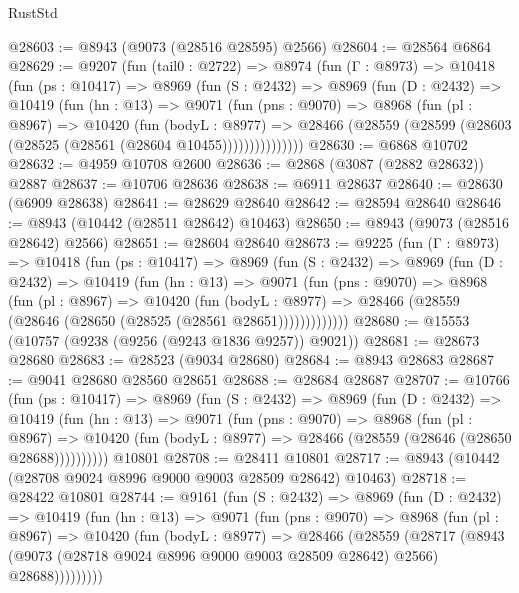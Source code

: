 \begin{lexlean}{RustStd}
\begin{coremodule}
{\begin{coremodule}
{{{{{{{{{{{{{{{{{{{{{{{{{{{{{{{{{{{{{{{@28603 := @8943 (@9073 (@28516 @28595) @2566)
@28604 := @28564 @6864
@28629 := @9207
    (fun (tail0 : @2722) =>
    @8974
      (fun (Γ : @8973) =>
      @10418
        (fun (ps : @10417) =>
        @8969
          (fun (S : @2432) =>
          @8969
            (fun (D : @2432) =>
            @10419
              (fun (hn : @13) =>
              @9071
                (fun (pns : @9070) =>
                @8968
                  (fun (pl : @8967) =>
                  @10420
                    (fun (bodyL : @8977) =>
                    @28466 (@28559 (@28599 (@28603 (@28525 (@28561 (@28604 @10455)))))))))))))))
@28630 := @6868 @10702
@28632 := @4959 @10708 @2600
@28636 := @2868 (@3087 (@2882 @28632)) @2887
@28637 := @10706 @28636
@28638 := @6911 @28637
@28640 := @28630 (@6909 @28638)
@28641 := @28629 @28640
@28642 := @28594 @28640
@28646 := @8943 (@10442 (@28511 @28642) @10463)
@28650 := @8943 (@9073 (@28516 @28642) @2566)
@28651 := @28604 @28640
@28673 := @9225
    (fun (Γ : @8973) =>
    @10418
      (fun (ps : @10417) =>
      @8969
        (fun (S : @2432) =>
        @8969
          (fun (D : @2432) =>
          @10419
            (fun (hn : @13) =>
            @9071
              (fun (pns : @9070) =>
              @8968
                (fun (pl : @8967) =>
                @10420
                  (fun (bodyL : @8977) =>
                  @28466 (@28559 (@28646 (@28650 (@28525 (@28561 @28651)))))))))))))
@28680 := @15553 (@10757 (@9238 (@9256 (@9243 @1836 @9257)) @9021))
@28681 := @28673 @28680
@28683 := @28523 (@9034 @28680)
@28684 := @8943 @28683
@28687 := @9041 @28680 @28560 @28651
@28688 := @28684 @28687
@28707 := @10766
    (fun (ps : @10417) =>
    @8969
      (fun (S : @2432) =>
      @8969
        (fun (D : @2432) =>
        @10419
          (fun (hn : @13) =>
          @9071
            (fun (pns : @9070) =>
            @8968
              (fun (pl : @8967) =>
              @10420 (fun (bodyL : @8977) => @28466 (@28559 (@28646 (@28650 @28688))))))))))
    @10801
@28708 := @28411 @10801
@28717 := @8943 (@10442 (@28708 @9024 @8996 @9000 @9003 @28509 @28642) @10463)
@28718 := @28422 @10801
@28744 := @9161
    (fun (S : @2432) =>
    @8969
      (fun (D : @2432) =>
      @10419
        (fun (hn : @13) =>
        @9071
          (fun (pns : @9070) =>
          @8968
            (fun (pl : @8967) =>
            @10420
              (fun (bodyL : @8977) =>
              @28466
                (@28559
                  (@28717
                    (@8943
                      (@9073 (@28718 @9024 @8996 @9000 @9003 @28509 @28642) @2566)
                      @28688)))))))))
}}}}}}}}}}}}}}}}}}}}}}}}}}}}}}}}}}}}}}}
\end{coremodule}}
\end{coremodule}
\end{lexlean}
